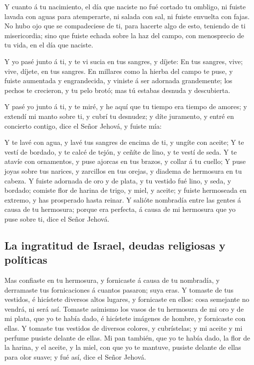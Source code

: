  Y cuanto á tu nacimiento, el día que naciste no fué
cortado tu ombligo, ni fuiste lavada con aguas para atemperarte, ni
salada con sal, ni fuiste envuelta con fajas.  No hubo ojo
que se compadeciese de ti, para hacerte algo de esto, teniendo de ti
misericordia; sino que fuiste echada sobre la haz del campo, con
menosprecio de tu vida, en el día que naciste.

 Y yo pasé junto á ti, y te vi sucia en tus sangres, y
díjete: En tus sangres, vive; vive, díjete, en tus sangres.
 En millares como la hierba del campo te puse, y fuiste
aumentada y engrandecida, y viniste á ser adornada grandemente; los
pechos te crecieron, y tu pelo brotó; mas tú estabas desnuda y
descubierta.

 Y pasé yo junto á ti, y te miré, y he aquí que tu tiempo
era tiempo de amores; y extendí mi manto sobre ti, y cubrí tu desnudez;
y díte juramento, y entré en concierto contigo, dice el Señor Jehová, y
fuiste mía:

 Y te lavé con agua, y lavé tus sangres de encima de ti, y
ungíte con aceite;  Y te vestí de bordado, y te calcé de
tejón, y ceñíte de lino, y te vestí de seda.  Y te atavíe
con ornamentos, y puse ajorcas en tus brazos, y collar á tu cuello;
 Y puse joyas sobre tus narices, y zarcillos en tus
orejas, y diadema de hermosura en tu cabeza.  Y fuiste
adornada de oro y de plata, y tu vestido fué lino, y seda, y bordado;
comiste flor de harina de trigo, y miel, y aceite; y fuiste hermoseada
en extremo, y has prosperado hasta reinar.  Y salióte
nombradía entre las gentes á causa de tu hermosura; porque era perfecta,
á causa de mi hermosura que yo puse sobre ti, dice el Señor Jehová.

\hypertarget{la-ingratitud-de-israel-deudas-religiosas-y-poluxedticas}{%
\subsection{La ingratitud de Israel, deudas religiosas y
políticas}\label{la-ingratitud-de-israel-deudas-religiosas-y-poluxedticas}}

 Mas confiaste en tu hermosura, y fornicaste á causa de
tu nombradía, y derramaste tus fornicaciones á cuantos pasaron; suya
eras.  Y tomaste de tus vestidos, é hicístete diversos
altos lugares, y fornicaste en ellos: cosa semejante no vendrá, ni será
así.  Tomaste asimismo los vasos de tu hermosura de mi
oro y de mi plata, que yo te había dado, é hicístete imágenes de hombre,
y fornicaste con ellas.  Y tomaste tus vestidos de
diversos colores, y cubrístelas; y mi aceite y mi perfume pusiste
delante de ellas.  Mi pan también, que yo te había dado,
la flor de la harina, y el aceite, y la miel, con que yo te mantuve,
pusiste delante de ellas para olor suave; y fué así, dice el Señor
Jehová.

